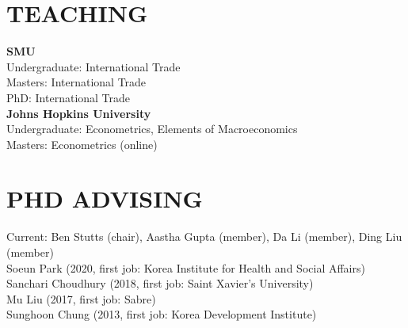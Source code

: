 \documentclass[11pt]{res}
\begin{document}
\begin{resume}
\section{TEACHING} \vspace{1.5mm}
\textbf{SMU}\vspace{1.5mm}\\
Undergraduate: International Trade\vspace{1.5mm}\\
Masters: International Trade\vspace{1.5mm}\\
PhD: International Trade\vspace{4mm}\\
\textbf{Johns Hopkins University}\vspace{1.5mm}\\
Undergraduate: Econometrics, Elements of Macroeconomics\vspace{1.5mm}\\
Masters: Econometrics (online)

\section{PHD ADVISING} \vspace{1.5mm}
Current: Ben Stutts (chair), Aastha Gupta (member), Da Li (member), Ding Liu (member)\vspace{1.5mm}\\
Soeun Park (2020, first job: Korea Institute for Health and Social Affairs)\vspace{1.5mm}\\
Sanchari Choudhury (2018, first job: Saint Xavier's University)\vspace{1.5mm}\\
Mu Liu (2017, first job: Sabre)\vspace{1.5mm}\\
Sunghoon Chung (2013, first job: Korea Development Institute)


\end{resume}
\end{document}
